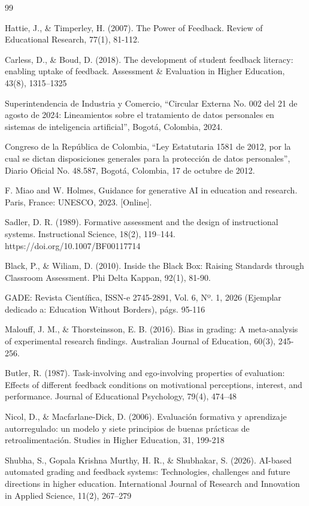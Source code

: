 \documentclass[letterpaper, 10 pt, conference]{ieeeconf}  %
\begin{document}
\begin{thebibliography}{99}

 Hattie, J., \& Timperley, H. (2007). The Power of Feedback. Review of Educational Research, 77(1), 81-112.

 Carless, D., \& Boud, D. (2018). The development of student feedback literacy: enabling uptake of feedback. Assessment \& Evaluation in Higher Education, 43(8), 1315–1325

 Superintendencia de Industria y Comercio, “Circular Externa No. 002 del 21 de agosto de 2024: Lineamientos sobre el tratamiento de datos personales en sistemas de inteligencia artificial”, Bogotá, Colombia, 2024.

 Congreso de la República de Colombia, “Ley Estatutaria 1581 de 2012, por la cual se dictan disposiciones generales para la protección de datos personales”, Diario Oficial No. 48.587, Bogotá, Colombia, 17 de octubre de 2012.

 F. Miao and W. Holmes, Guidance for generative AI in education and research. Paris, France: UNESCO, 2023. [Online].

 Sadler, D. R. (1989). Formative assessment and the design of instructional systems. Instructional Science, 18(2), 119–144. https://doi.org/10.1007/BF00117714

 Black, P., \& Wiliam, D. (2010). Inside the Black Box: Raising Standards through Classroom Assessment. Phi Delta Kappan, 92(1), 81-90.

 GADE: Revista Científica, ISSN-e 2745-2891, Vol. 6, Nº. 1, 2026 (Ejemplar dedicado a: Education Without Borders), págs. 95-116

  Malouff, J. M., \& Thorsteinsson, E. B. (2016). Bias in grading: A meta-analysis of experimental research findings. Australian Journal of Education, 60(3), 245-256.

 Butler, R. (1987). Task-involving and ego-involving properties of evaluation: Effects of different feedback conditions on motivational perceptions, interest, and performance. Journal of Educational Psychology, 79(4), 474–48

 Nicol, D., \& Macfarlane-Dick, D. (2006). Evaluación formativa y aprendizaje autorregulado: un modelo y siete principios de buenas prácticas de retroalimentación. Studies in Higher Education, 31, 199-218

 Shubha, S., Gopala Krishna Murthy, H. R., \& Shubhakar, S. (2026). AI-based automated grading and feedback systems: Technologies, challenges and future directions in higher education. International Journal of Research and Innovation in Applied Science, 11(2), 267–279


\end{thebibliography}
\end{document}

